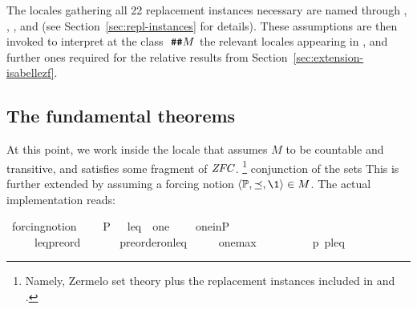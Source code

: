 %

The locales gathering all 22 replacement instances necessary are named
 through ,
,
, and
 (see
Section~\ref{sec:repl-instances} for details).
These assumptions are then invoked to interpret at the class
$\isatt{\#\#} M$ the relevant locales appearing in
, and further ones required for the relative
results from Section~\ref{sec:extension-isabellezf}.


\subsection{The fundamental theorems}\label{sec:fundamental-theorems}
At this point, we work inside the locale  that
assumes $M$ to be
countable and transitive, and satisfies some fragment of
$\mathit{ZFC}$.
\footnote{%
Namely, Zermelo set theory plus the replacement instances included in
 and .
}%
conjunction of the sets This is further extended by assuming a forcing notion
$\lb \PP, {\preceq} ,\1\rb \in M$. The actual implementation reads:

\begin{isabelle}
\isamarkupfalse%
\ forcing{\isacharunderscore}{\kern0pt}notion\ {\isacharequal}{\kern0pt}\isanewline
\ \ \ P\ {\isacharparenleft}{\kern0pt}{\isacartoucheopen}{\isasymbbbP}{\isacartoucheclose}{\isacharparenright}{\kern0pt}\ \ leq\ \ one\ {\isacharparenleft}{\kern0pt}{\isacartoucheopen}{\isasymone}{\isacartoucheclose}{\isacharparenright}{\kern0pt}\isanewline
\ \ \ one{\isacharunderscore}{\kern0pt}in{\isacharunderscore}{\kern0pt}P{\isacharcolon}{\kern0pt}\ \ \ \ \ \ \ {\isachardoublequoteopen}{\isasymone}\ {\isasymin}\ {\isasymbbbP}{\isachardoublequoteclose}\isanewline
\ \ \ \ \ leq{\isacharunderscore}{\kern0pt}preord{\isacharcolon}{\kern0pt}\ \ \ \ \ \ \ {\isachardoublequoteopen}preorder{\isacharunderscore}{\kern0pt}on{\isacharparenleft}{\kern0pt}{\isasymbbbP}{\isacharcomma}{\kern0pt}leq{\isacharparenright}{\kern0pt}{\isachardoublequoteclose}\isanewline
\ \ \ \ \ one{\isacharunderscore}{\kern0pt}max{\isacharcolon}{\kern0pt}\ \ \ \ \ \ \ \ \ \ {\isachardoublequoteopen}{\isasymforall}p{\isasymin}{\isasymbbbP}{\isachardot}{\kern0pt}\ {\isasymlangle}p{\isacharcomma}{\kern0pt}{\isasymone}{\isasymrangle}{\isasymin}leq{\isachardoublequoteclose}
\end{isabelle}

